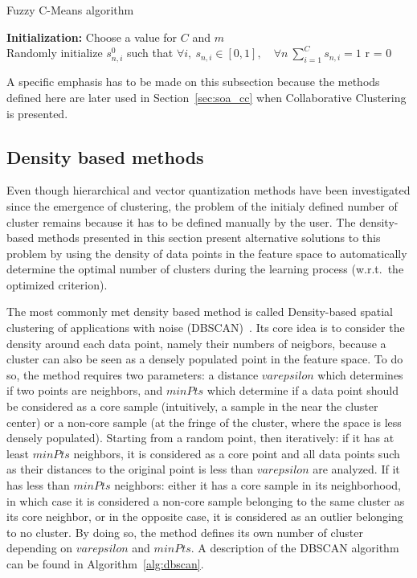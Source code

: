     \begin{algorithm}
        \caption{Fuzzy C-Means algorithm}
\label{alg:fcm}
    \textbf{Initialization:} Choose a value for $C$ and $m$\\
    Randomly initialize $s^0_{n,i}$ such that $\forall i, ~ s_{n,i} \in [0,1], \quad \forall n ~ \sum\limits_{i=1}^C s_{n,i} = 1$
    r = 0
\end{algorithm}

A specific emphasis has to be made on this subsection because the methods defined here are later used in Section~\ref{sec:soa_cc} when Collaborative Clustering is presented.

\subsection{Density based methods}

Even though hierarchical and vector quantization methods have been investigated since the emergence of clustering, the problem of the initialy defined number of cluster remains because it has to be defined manually by the user. The density-based methods presented in this section present alternative solutions to this problem by using the density of data points in the feature space to automatically determine the optimal number of clusters during the learning process (w.r.t.\ the optimized criterion). 

The most commonly met density based method is called Density-based spatial clustering of applications with noise (DBSCAN)~\cite{ester1996density}. Its core idea is to consider the density around each data point, namely their numbers of neigbors, because a cluster can also be seen as a densely populated point in the feature space. To do so, the method requires two parameters: a distance $varepsilon$ which determines if two points are neighbors, and $minPts$ which determine if a data point should be considered as a core sample (intuitively, a sample in the near the cluster center) or a non-core sample (at the fringe of the cluster, where the space is less densely populated). Starting from a random point, then iteratively: if it has at least $minPts$ neighbors, it is considered as a core point and all data points such as their distances to the original point is less than $varepsilon$ are analyzed. If it has less than $minPts$ neighbors: either it has a core sample in its neighborhood, in which case it is considered a non-core sample belonging to the same cluster as its core neighbor, or in the opposite case, it is considered as an outlier belonging to no cluster. By doing so, the method defines its own number of cluster depending on $varepsilon$ and $minPts$. A description of the DBSCAN algorithm can be found in Algorithm~\ref{alg:dbscan}. 


